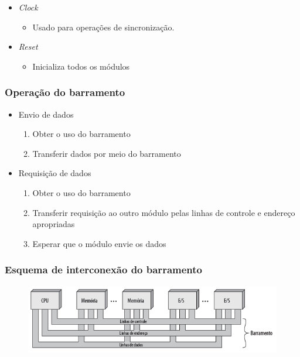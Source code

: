 \documentclass[aspectratio=169,
				xcolor=table]{beamer}
\begin{document}
\begin{frame}[allowframebreaks]
\begin{itemize}
			\framebreak
			\item \textit{Clock}
			\begin{itemize}
				\item Usado para operações de sincronização.
			\end{itemize}
			\item \textit{Reset}
			\begin{itemize}
				\item Inicializa todos os módulos
			\end{itemize}
		\end{itemize}
	\end{frame}
	
	\begin{frame}
		\frametitle{Operação do barramento}
		\begin{itemize}
			\item Envio de dados
			\begin{enumerate}[I]
				\item Obter o uso do barramento
				\vspace{.5em}
				\item Transferir dados por meio do barramento
			\end{enumerate}
			\vspace{1em}
			\pause
			\item Requisição de dados
			\begin{enumerate}[I]
				\item Obter o uso do barramento
				\vspace{.5em}
				\item Transferir requisição ao outro módulo pelas linhas de controle e endereço apropriadas
				\vspace{.5em}
				\item Esperar que o módulo envie os dados
			\end{enumerate}
		\end{itemize}
	\end{frame}
	
	\begin{frame}
		\frametitle{Esquema de interconexão do barramento}
		\begin{figure}[hbtp]
		\centering
		\includegraphics[width=.95\textwidth]{../figs/cap11/barramento.png}
		\end{figure}
		
	\end{frame}
	
\end{document}
